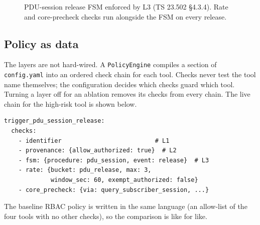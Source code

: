 \documentclass[conference]{IEEEtran}
\newcommand{\code}[1]{\texttt{\small #1}}
\begin{document}
\begin{figure}[t]
\centering
{}
\caption{PDU-session release FSM enforced by L3 (TS 23.502 \S4.3.4). Rate and core-precheck
checks run alongside the FSM on every release.}
\label{fig:fsm}
\end{figure}

\subsection{Policy as data}
The layers are not hard-wired. A \code{PolicyEngine} compiles a section of
\code{config.yaml} into an ordered check chain for each tool. Checks never test the tool
name themselves; the configuration decides which checks guard which tool. Turning a layer
off for an ablation removes its checks from every chain. The live chain for the high-risk
tool is shown below.

\begin{lstlisting}
trigger_pdu_session_release:
  checks:
    - identifier                          # L1
    - provenance: {allow_authorized: true}  # L2
    - fsm: {procedure: pdu_session, event: release}  # L3
    - rate: {bucket: pdu_release, max: 3,
             window_sec: 60, exempt_authorized: false}
    - core_precheck: {via: query_subscriber_session, ...}
\end{lstlisting}

The baseline RBAC policy is written in the same language (an allow-list of the four tools
with no other checks), so the comparison is like for like.
\end{document}
